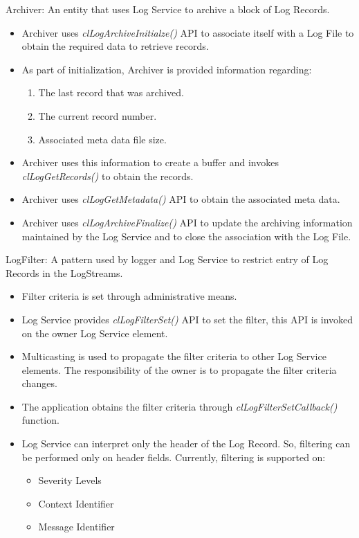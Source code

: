 \begin{flushleft}
\begin{Desc}
\item
[Archiver:] An entity that uses Log Service to archive a block of Log Records.
\begin{itemize}
\item Archiver uses \textit{clLogArchiveInitialze()} API to associate itself with a Log File to obtain the required data to retrieve records.
\item 	As part of initialization, Archiver is provided information regarding:
\begin{enumerate} \item The last record that was archived.
\item	The current record number.
\item	Associated meta data file size.
\end{enumerate}
\item	Archiver uses this information to create a buffer and invokes \textit{clLogGetRecords()} to obtain the records.
\item	Archiver uses \textit{clLogGetMetadata()} API to obtain the associated meta data.
\item	Archiver uses \textit{clLogArchiveFinalize()} API to update the archiving information maintained by the Log Service and 
to close the association with the Log File.
\end{itemize}
\end{Desc}


\begin{Desc}
\item
[LogFilter:] A pattern used by logger and Log Service to restrict entry of Log Records in the LogStreams.
\begin{itemize}
\item Filter criteria is set through administrative means. 
\item Log Service provides \textit{clLogFilterSet()} API to set the filter, this API is invoked on the owner Log Service element. 
\item Multicasting is used to propagate the filter criteria to other Log Service elements. The responsibility of the owner is to propagate the 
filter criteria changes.
\item The application obtains the filter criteria through \textit{clLogFilterSetCallback()} function.
\item Log Service can interpret only the header of the Log Record. So, filtering can be performed only on header fields. Currently, 
filtering is supported on:
\begin{itemize}
\item
Severity Levels 
\item
Context Identifier 
\item
Message Identifier
\end{itemize}
\end{itemize}
\end{Desc}






\end{flushleft}
